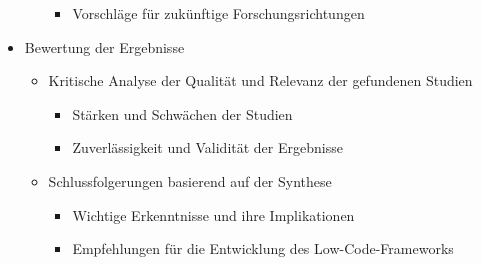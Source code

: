 \begin{itemize}
\begin{itemize}
\begin{itemize}
                    \item Vorschläge für zukünftige Forschungsrichtungen
                \end{itemize}
        \end{itemize}
    \item Bewertung der Ergebnisse
        \begin{itemize}
            \item Kritische Analyse der Qualität und Relevanz der gefundenen Studien
                \begin{itemize}
                    \item Stärken und Schwächen der Studien
                    \item Zuverlässigkeit und Validität der Ergebnisse
                \end{itemize}
            \item Schlussfolgerungen basierend auf der Synthese
                \begin{itemize}
                    \item Wichtige Erkenntnisse und ihre Implikationen
                    \item Empfehlungen für die Entwicklung des Low-Code-Frameworks
                \end{itemize}
        \end{itemize}
\end{itemize}


